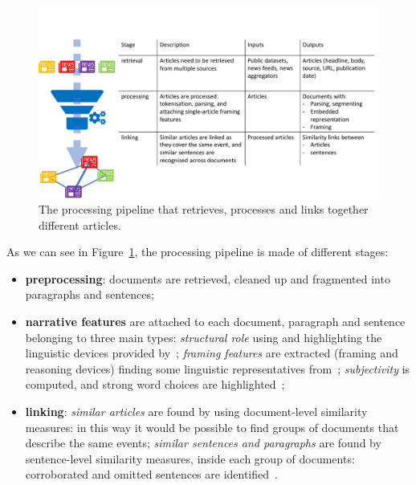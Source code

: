 \begin{figure}[!htb]
    \centering
    \includegraphics[width=\textwidth]{figures/figure_pipeline.pdf}
    \caption{The processing pipeline that retrieves, processes and links together different articles.}
    \label{fig:pipeline}
\end{figure}

As we can see in Figure~\ref{fig:pipeline}, the processing pipeline is made of different stages:
\begin{itemize}
    \item \textbf{preprocessing}: documents are retrieved, cleaned up and fragmented into paragraphs and sentences;
    \item \textbf{narrative features} are attached to each document, paragraph and sentence belonging to three main types:
    \emph{structural role} using and highlighting the linguistic devices provided by~\cite{zahid2019towards};
    \emph{framing features} are extracted (framing and reasoning devices) finding some linguistic representatives from~\cite{gamson1989media,fillmore2006frame};
    \emph{subjectivity} is computed, and strong word choices are highlighted~\cite{liu2010sentiment};
    \item \textbf{linking}: \emph{similar articles} are found by using document-level similarity measures: in this way it would be possible to find groups of documents that describe the same events; \emph{similar sentences and paragraphs} are found by sentence-level similarity measures, inside each group of documents: corroborated and omitted sentences are identified~\cite{bountouridis2018explaining}.
\end{itemize}



